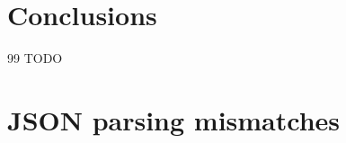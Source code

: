 \documentclass[english, 12pt, a4paper, sci, utf8, a-2b, online]{aaltothesis}
\begin{document}
\section{Conclusions}

\clearpage

\thesisbibliography

\begin{thebibliography}{99}
		TODO
\end{thebibliography}



\clearpage

\thesisappendix

\section{JSON parsing mismatches}
\label{appendix:mismatches}
\end{document}
